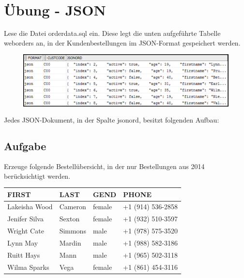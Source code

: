 \section{Übung - JSON}
\label{sec:uebung_10}
Lese die Datei orderdata.sql ein. Diese legt die unten aufgeführte Tabelle weborders an, in der Kundenbestellungen im JSON-Format gespeichert werden.

\begin{figure}[H]
  \centering
  \includegraphics[width=1\textwidth]{img//uebung_10_-_vorbereitung.png}
  \label{img:uebung_10_-_vorbereitung}
\end{figure}

Jedes JSON-Dokument, in der Spalte jsonord, besitzt folgenden Aufbau:

\subsection{Aufgabe}
\label{sec:uebung_10.aufgabe_01}
Erzeuge folgende Bestellübersicht, in der nur Bestellungen aus 2014 berücksichtigt werden.

\begin{table}[H]
  \centering
  \ttfamily
  \begin{tabular}{|l|l|l|l|}
    \hline
    \textbf{FIRST}  & \textbf{LAST}   & \textbf{GEND} & \textbf{PHONE}      \\
    \hline
    Lakeisha Wood   & Cameron         & female        & +1 (914) 536-2858   \\
    Jenifer Silva   & Sexton          & female        & +1 (932) 510-3597   \\
    Wright Cate     & Simmons         & male          & +1 (978) 575-3520   \\
    Lynn May        & Mardin          & male          & +1 (988) 582-3186   \\
    Ruitt Hays      & Mann            & male          & +1 (965) 502-3118   \\
    Wilma Sparks    & Vega            & female        & +1 (861) 454-3116   \\
    \hline
  \end{tabular}
\end{table}

